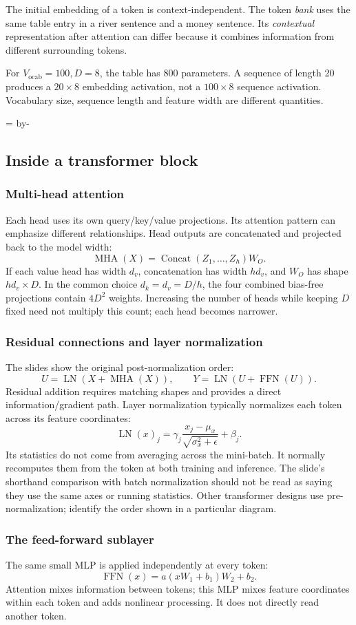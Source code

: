 \documentclass[11pt]{article}
\newcommand{\newsubsection}[1]{\par\begingroup\skip0=\pagegoal\advance\skip0 by-\pagetotal\ifdim\skip0<12\baselineskip\newpage\fi\endgroup\subsection{#1}}
\begin{document}
The initial embedding of a token is context-independent. The token \emph{bank} uses the same table entry in a river sentence and a money sentence. Its \emph{contextual} representation after attention can differ because it combines information from different surrounding tokens.

For $V_{\mathrm{ocab}}=100,D=8$, the table has 800 parameters. A sequence of length 20 produces a $20\times8$ embedding activation, not a $100\times8$ sequence activation. Vocabulary size, sequence length and feature width are different quantities.

\newsubsection{Inside a transformer block}
\subsubsection{Multi-head attention}
Each head uses its own query/key/value projections. Its attention pattern can emphasize different relationships. Head outputs are concatenated and projected back to the model width:
\[
\operatorname{MHA}(X)=
\operatorname{Concat}(Z_1,\ldots,Z_h)W_O.
\]
If each value head has width $d_v$, concatenation has width $hd_v$, and $W_O$ has shape $hd_v\times D$. In the common choice $d_k=d_v=D/h$, the four combined bias-free projections contain $4D^2$ weights. Increasing the number of heads while keeping $D$ fixed need not multiply this count; each head becomes narrower.

\subsubsection{Residual connections and layer normalization}
The slides show the original post-normalization order:
\[
U=\operatorname{LN}(X+\operatorname{MHA}(X)),\qquad
Y=\operatorname{LN}(U+\operatorname{FFN}(U)).
\]
Residual addition requires matching shapes and provides a direct information/gradient path. Layer normalization typically normalizes each token across its feature coordinates:
\[
\operatorname{LN}(x)_j=\gamma_j
\frac{x_j-\mu_x}{\sqrt{\sigma_x^2+\epsilon}}+\beta_j.
\]
Its statistics do not come from averaging across the mini-batch. It normally recomputes them from the token at both training and inference. The slide's shorthand comparison with batch normalization should not be read as saying they use the same axes or running statistics. Other transformer designs use pre-normalization; identify the order shown in a particular diagram.

\subsubsection{The feed-forward sublayer}
The same small MLP is applied independently at every token:
\[
\operatorname{FFN}(x)=a(xW_1+b_1)W_2+b_2.
\]
Attention mixes information between tokens; this MLP mixes feature coordinates within each token and adds nonlinear processing. It does not directly read another token.
\end{document}
